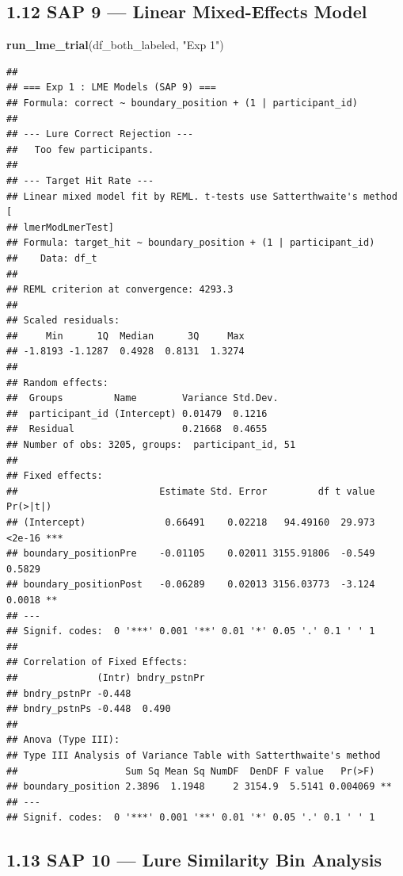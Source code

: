 \documentclass[
]{article}
\newenvironment{Shaded}{\begin{snugshade}}{\end{snugshade}}
\newcommand{\FunctionTok}[1]{\textcolor[rgb]{0.13,0.29,0.53}{\textbf{#1}}}
\newcommand{\NormalTok}[1]{#1}
\newcommand{\StringTok}[1]{\textcolor[rgb]{0.31,0.60,0.02}{#1}}
\begin{document}
\subsection{1.12 SAP 9 --- Linear Mixed-Effects
Model}\label{sap-9-linear-mixed-effects-model}

\begin{Shaded}
\begin{Highlighting}[]
\FunctionTok{run\_lme\_trial}\NormalTok{(df\_both\_labeled, }\StringTok{"Exp 1"}\NormalTok{)}
\end{Highlighting}
\end{Shaded}

\begin{verbatim}
## 
## === Exp 1 : LME Models (SAP 9) ===
## Formula: correct ~ boundary_position + (1 | participant_id)
## 
## --- Lure Correct Rejection ---
##   Too few participants.
## 
## --- Target Hit Rate ---
## Linear mixed model fit by REML. t-tests use Satterthwaite's method [
## lmerModLmerTest]
## Formula: target_hit ~ boundary_position + (1 | participant_id)
##    Data: df_t
## 
## REML criterion at convergence: 4293.3
## 
## Scaled residuals: 
##     Min      1Q  Median      3Q     Max 
## -1.8193 -1.1287  0.4928  0.8131  1.3274 
## 
## Random effects:
##  Groups         Name        Variance Std.Dev.
##  participant_id (Intercept) 0.01479  0.1216  
##  Residual                   0.21668  0.4655  
## Number of obs: 3205, groups:  participant_id, 51
## 
## Fixed effects:
##                         Estimate Std. Error         df t value Pr(>|t|)    
## (Intercept)              0.66491    0.02218   94.49160  29.973   <2e-16 ***
## boundary_positionPre    -0.01105    0.02011 3155.91806  -0.549   0.5829    
## boundary_positionPost   -0.06289    0.02013 3156.03773  -3.124   0.0018 ** 
## ---
## Signif. codes:  0 '***' 0.001 '**' 0.01 '*' 0.05 '.' 0.1 ' ' 1
## 
## Correlation of Fixed Effects:
##              (Intr) bndry_pstnPr
## bndry_pstnPr -0.448             
## bndry_pstnPs -0.448  0.490      
## 
## Anova (Type III):
## Type III Analysis of Variance Table with Satterthwaite's method
##                   Sum Sq Mean Sq NumDF  DenDF F value   Pr(>F)   
## boundary_position 2.3896  1.1948     2 3154.9  5.5141 0.004069 **
## ---
## Signif. codes:  0 '***' 0.001 '**' 0.01 '*' 0.05 '.' 0.1 ' ' 1
\end{verbatim}

\subsection{1.13 SAP 10 --- Lure Similarity Bin
Analysis}\label{sap-10-lure-similarity-bin-analysis}
\end{document}
